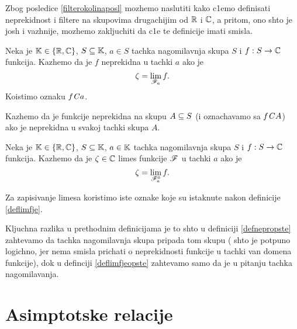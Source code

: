 \documentclass[../maing.tex]{subfiles}
\begin{document}
    Zbog posledice \ref{filterokolinaposl} mozhemo naslutiti kako c1emo definisati neprekidnost i filtere na skupovima drugachijim od $\mathbb{R}$ i $\mathbb{C}$,
    a pritom, ono shto je josh i vazhnije, mozhemo zakljuchiti da c1e te definicije imati smisla. 

    \begin{de}
    	\label{defnepropste}
    	Neka je $\mathbb{K}\in \{\mathbb{R}, \mathbb{C}\}$, $S\subseteq \mathbb{K}$, $a\in S$ tachka nagomilavnja skupa $S$ i $f:S \to \mathbb{C}$ funkcija. Kazhemo da je $f$ neprekidna u tachki $a$
	ako je \[\zeta=\lim_{\mathscr{F}_a}f.\] Koistimo oznaku $f\mathit{C} a$.
    \end{de}
    Kazhemo da je funkcije neprekidna na skupu $A \subseteq S$ (i oznachavamo sa $f \mathit{C} A$) ako je neprekidna u svakoj tachki skupa $A$.
    \begin{de}
    	\label{deflimfjeopste}
    	Neka je $\mathbb{K}\in \{\mathbb{R}, \mathbb{C}\}$, $S\subseteq \mathbb{K}$, $a\in \mathbb{K}$ tachka nagomilavnja skupa $S$ i $f:S \to \mathbb{C}$ funkcija.
	Kazhemo da je $\zeta \in \mathbb{C}$ limes funkcije $\mathscr{F}$ u tachki $a$
	ako je \[\zeta=\lim_{\mathscr{F}_a^0}f.\] 
    \end{de}
    Za zapisivanje limesa koristimo iste oznake koje su istaknute nakon definicije \ref{deflimfje}.

    \begin{nap}
    	Kljuchna razlika u prethodnim definicijama je to shto u definiciji \ref{defnepropste} zahtevamo da tachka nagomilavnja skupa pripada tom skupu (
	shto je potpuno logichno, jer nema smisla prichati o neprekidnosti funkcije u tachki van domena funkcije), dok u definciji \ref{deflimfjeopste} 
	zahtevamo samo da je u pitanju tachka nagomilavanja.
    \end{nap}
\section{Asimptot\-ske relacije}
    
    
\end{document}
